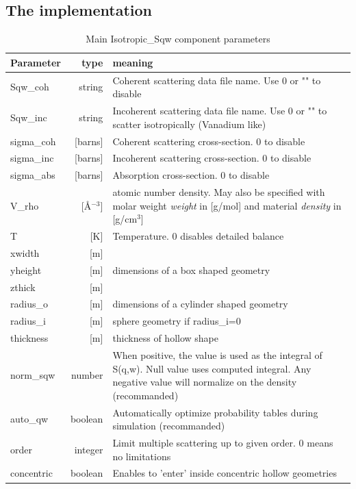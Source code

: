 \subsection{The implementation}

\begin{table}
  \begin{center}
  {\let\my=\\
    \begin{tabular}{|lr|p{}|}
    \hline
Parameter & type & meaning \\
    \hline
Sqw\_coh   & string              & Coherent scattering data file name. Use 0 or "" to disable  \\
Sqw\_inc   & string              & Incoherent scattering data file name. Use 0 or "" to scatter isotropically (Vanadium like)  \\
sigma\_coh & [barns]      & Coherent scattering cross-section. 0 to disable \\
sigma\_inc & [barns]      & Incoherent scattering cross-section. 0 to disable \\
sigma\_abs & [barns]      & Absorption cross-section. 0 to disable  \\
V\_rho     & [\AA$^{-3}$] & atomic number density. May also be specified with molar weight \emph{weight} in [g/mol] and material \emph{density} in [g/cm$^3$] \\
T          & [K]          & Temperature. 0 disables detailed balance \\
    \hline
xwidth   & [m] & \\
yheight  & [m] & dimensions of a box shaped geometry \\
zthick   & [m] & \\
radius\_o & [m] & dimensions of a cylinder shaped geometry  \\
radius\_i & [m] & sphere geometry if radius\_i=0  \\
thickness& [m] & thickness of hollow shape  \\
    \hline
norm\_sqw & number  & When positive, the value is used as the integral of S(q,w). Null value uses computed integral. Any negative value will normalize on the density (recommanded) \\
auto\_qw  & boolean & Automatically optimize probability tables during simulation (recommanded)  \\
order     & integer & Limit multiple scattering up to given order. 0 means no limitations  \\
concentric& boolean & Enables to 'enter' inside concentric hollow geometries  \\
    \hline
    \end{tabular}
    \caption{Main Isotropic\_Sqw component parameters}
    \label{t:sqw-param}
  }
  \end{center}
\end{table}

